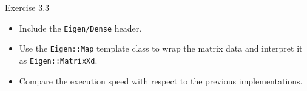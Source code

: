 \documentclass[10pt,aspectratio=169]{beamer}
\begin{document}
\begin{frame}{Exercise 3.3}
    \begin{itemize}
        \item Include the \texttt{Eigen/Dense} header.
        \item Use the \texttt{Eigen::Map} template class to wrap the matrix data and interpret it as \texttt{Eigen::MatrixXd}.
        \item Compare the execution speed with respect to the previous implementations.
    \end{itemize}
\end{frame}
\end{document}

